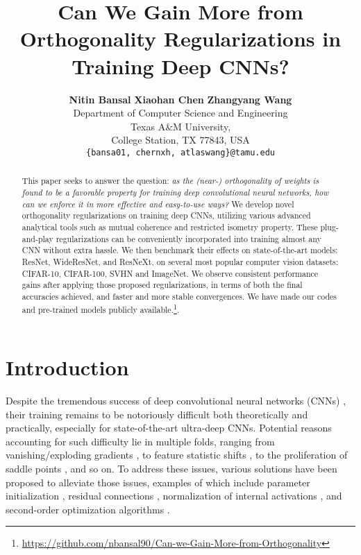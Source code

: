 \documentclass{article}
\title{Can We Gain More from Orthogonality Regularizations in Training Deep CNNs?}
\author{
  {\bf Nitin Bansal}\hspace{0.5cm} {\bf Xiaohan Chen}\hspace{0.5cm} {\bf Zhangyang Wang} \\
  Department of Computer Science and Engineering\\
  Texas A\&M University,\\College Station, TX 77843, USA \\
  \texttt{\{bansa01, chernxh, atlaswang\}@tamu.edu} \\
}
\newcounter{ass_counter}
\newcounter{thm_counter}
\begin{document}
\maketitle
\begin{abstract}
This paper seeks to answer the question: \textit{as the (near-) orthogonality of weights is found to be a favorable property for training deep convolutional neural networks, how can we enforce it in more effective and easy-to-use ways?} We develop novel orthogonality regularizations on training deep CNNs, utilizing various advanced analytical tools such as mutual coherence and restricted isometry property. These plug-and-play regularizations can be conveniently incorporated into training almost any CNN without extra hassle. We then benchmark their effects on state-of-the-art models: ResNet, WideResNet, and ResNeXt, on several most popular computer vision datasets: CIFAR-10, CIFAR-100, SVHN and ImageNet. We observe consistent performance gains after applying those proposed regularizations, in terms of both the final accuracies achieved, and faster and more stable convergences. We have made our codes and pre-trained models publicly available.\footnote{\url{https://github.com/nbansal90/Can-we-Gain-More-from-Orthogonality}}.
\end{abstract}

\section{Introduction}
Despite the tremendous success of deep convolutional neural networks (CNNs) \cite{krizhevsky2012imagenet}, their training remains to be notoriously difficult both theoretically and practically, especially for state-of-the-art ultra-deep CNNs. Potential reasons accounting for such difficulty lie in multiple folds, ranging from vanishing/exploding gradients \cite{glorot2010understanding}, to feature statistic shifts \cite{ioffe2015batch}, to the proliferation of saddle points \cite{dauphin2014identifying}, and so on. To address these issues, various solutions have been proposed to alleviate those issues, examples of which include parameter initialization \cite{saxe2013exact}, residual connections \cite{he2016deep}, normalization of internal activations \cite{ioffe2015batch}, and second-order optimization algorithms \cite{dauphin2014identifying}.
\end{document}
